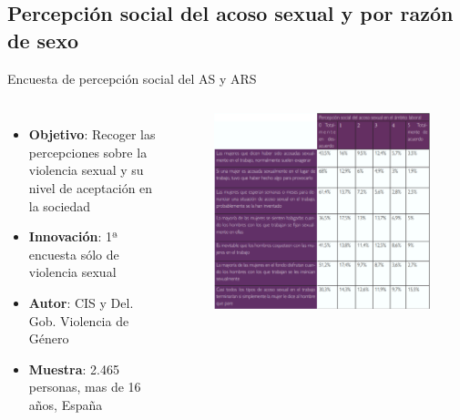 \documentclass{beamer}
\begin{document}
    \subsection{Percepción social del acoso sexual y por razón de sexo}
    \begin{frame}{Encuesta de percepción social del AS y ARS}
        \begin{columns}
            \begin{itemize}
                \item \textbf{Objetivo}: Recoger las percepciones sobre la violencia sexual y su nivel de aceptación en la sociedad
                \item \textbf{Innovación}: 1ª encuesta sólo de violencia sexual
                \item \textbf{Autor}: CIS y Del. Gob. Violencia de Género
                \item \textbf{Muestra}: 2.465 personas, mas de 16 años, España
            \end{itemize}
            \begin{figure}
                \includegraphics[width=\textwidth]{assets/encuesta_percepcion_social}
            \end{figure}
        \end{columns}
    \end{frame}
\end{document}
